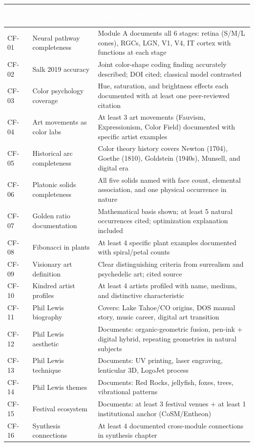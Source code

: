 \documentclass[11pt,letterpaper]{article}
\newcommand{\tableheader}[1]{\textbf{\sffamily\textcolor{white}{#1}}}
\begin{document}
\begin{center}
\begin{tabularx}{\textwidth}{L{1.5cm}L{3cm}X}
\toprule
{}
\tableheader{Test ID} & \tableheader{Verifies} & \tableheader{Expected Behavior} \\
\midrule
CF-01 & Neural pathway completeness & Module A documents all 6 stages: retina (S/M/L cones), RGCs, LGN, V1, V4, IT cortex with functions at each stage \\
CF-02 & Salk 2019 accuracy & Joint color-shape coding finding accurately described; DOI cited; classical model contrasted \\
CF-03 & Color psychology coverage & Hue, saturation, and brightness effects each documented with at least one peer-reviewed citation \\
CF-04 & Art movements as color labs & At least 3 art movements (Fauvism, Expressionism, Color Field) documented with specific artist examples \\
CF-05 & Historical arc completeness & Color theory history covers Newton (1704), Goethe (1810), Goldstein (1940s), Munsell, and digital era \\
CF-06 & Platonic solids completeness & All five solids named with face count, elemental association, and one physical occurrence in nature \\
CF-07 & Golden ratio documentation & Mathematical basis shown; at least 5 natural occurrences cited; optimization explanation included \\
CF-08 & Fibonacci in plants & At least 4 specific plant examples documented with spiral/petal counts \\
CF-09 & Visionary art definition & Clear distinguishing criteria from surrealism and psychedelic art; cited source \\
CF-10 & Kindred artist profiles & At least 4 artists profiled with name, medium, and distinctive characteristic \\
CF-11 & Phil Lewis biography & Covers: Lake Tahoe/CO origins, DOS manual story, music career, digital art transition \\
CF-12 & Phil Lewis aesthetic & Documents: organic-geometric fusion, pen-ink + digital hybrid, repeating geometries in natural subjects \\
CF-13 & Phil Lewis technique & Documents: UV printing, laser engraving, lenticular 3D, LogoJet process \\
CF-14 & Phil Lewis themes & Documents: Red Rocks, jellyfish, foxes, trees, vibrational patterns \\
CF-15 & Festival ecosystem & Documents: at least 3 festival venues + at least 1 institutional anchor (CoSM/Entheon) \\
CF-16 & Synthesis connections & At least 4 documented cross-module connections in synthesis chapter \\
\bottomrule
\end{tabularx}
\end{center}
\end{document}
